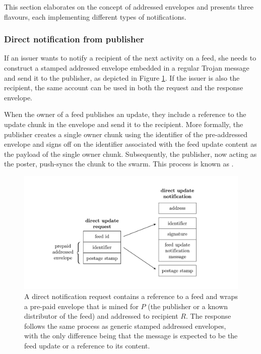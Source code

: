 
This section elaborates on the concept of addressed envelopes and presents three flavours, each implementing different types of notifications.

\subsubsection{Direct notification from publisher}

If an issuer wants to notify a recipient of the next activity on a feed, she needs to construct a stamped addressed envelope embedded in a regular Trojan message and send it to the publisher, as depicted in Figure \ref{fig:direct-notification}. If the issuer is also the recipient, the same account can be used in both the request and the response envelope. 


When the owner of a feed publishes an update, they include a reference to the update chunk in the envelope and send it to the recipient. More formally, the publisher creates a single owner chunk using the identifier of the pre-addressed envelope and signs off on the identifier associated with the feed update content as the payload of the single owner chunk. Subsequently, the publisher, now acting as the poster, push-syncs the chunk to the swarm. This process is known as . 

\begin{figure}[htbp]
   \centering
   \includegraphics[width=\textwidth]{fig/direct-notification.pdf}
   \caption[Direct notification request and response \statusgreen]{A direct notification request contains a reference to a feed and wraps a pre-paid envelope that is mined for $P$ (the publisher or a known distributor of the feed) and addressed to recipient $R$. The response follows the same process as generic stamped addressed envelopes, with the only difference being that the message is expected to be the feed update or a reference to its content.}
   \label{fig:direct-notification}
\end{figure}

